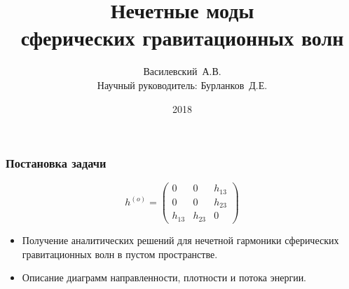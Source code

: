 \documentclass[compress]{beamer}
\title{Нечетные моды\\ сферических гравитационных волн}
\author[Василевский~А.В.]{
    Василевский~А.В. \\[\baselineskip]
    {\footnotesize Научный руководитель: Бурланков~Д.Е.}
}
\institute[ННГУ]{Нижегородский университет им. Н.И.~Лобачевского}
\date{2018}
\begin{document}

    \frame[plain]{\titlepage}


    \begin{frame}\frametitle{Постановка задачи}

        \begin{equation*}
            h^{(o)} = \begin{pmatrix}0&0&h_{13}\\0&0&h_{23}\\h_{13}&h_{23}&0\end{pmatrix}
        \end{equation*}

        \begin{itemize}
            \item Получение аналитических решений для нечетной гармоники сферических гравитационных волн в пустом пространстве.
            \item Описание диаграмм направленности, плотности и потока энергии.
        \end{itemize}

    \end{frame}

\end{document}
